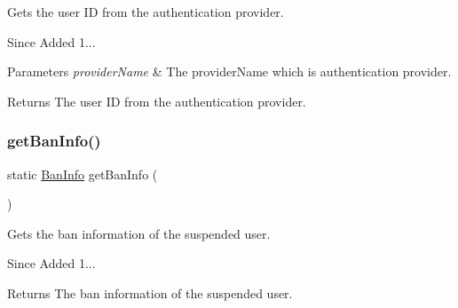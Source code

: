 Gets the user ID from the authentication provider. 

\begin{DoxySince}{Since}
Added 1... 
\end{DoxySince}

\begin{DoxyParams}{Parameters}
{\em provider\+Name} & The provider\+Name which is authentication provider. \\
\hline
\end{DoxyParams}
\begin{DoxyReturn}{Returns}
The user ID from the authentication provider. 
\end{DoxyReturn}
\mbox{\label{classcom_1_1toast_1_1android_1_1gamebase_1_1_gamebase_a61447d8f3f3a655ea83649465da9df62}} 
\subsubsection{\texorpdfstring{get\+Ban\+Info()}{getBanInfo()}}
{\footnotesize\ttfamily static \hyperlink{classcom_1_1toast_1_1android_1_1gamebase_1_1auth_1_1data_1_1_ban_info}{Ban\+Info} get\+Ban\+Info (\begin{DoxyParamCaption}{ }\end{DoxyParamCaption})\hspace{0.3cm}{\ttfamily [static]}}



Gets the ban information of the suspended user. 

\begin{DoxySince}{Since}
Added 1... 
\end{DoxySince}
\begin{DoxyReturn}{Returns}
The ban information of the suspended user. 
\end{DoxyReturn}
\mbox{\label{classcom_1_1toast_1_1android_1_1gamebase_1_1_gamebase_aea83ba0122198c967d745bb4b8d97215}} 
